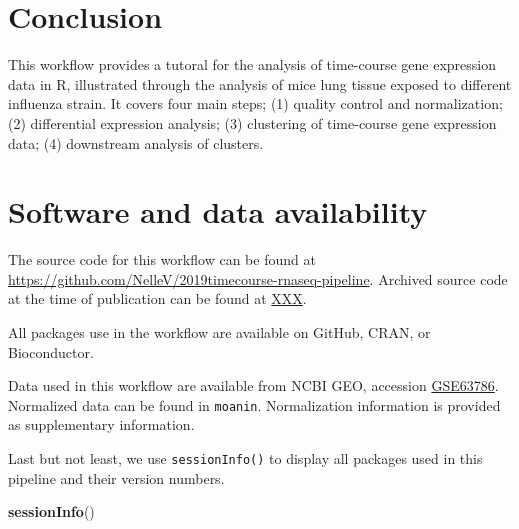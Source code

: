 \documentclass[9pt,a4paper,]{extarticle}
\newenvironment{Shaded}{\begin{snugshade}}{\end{snugshade}}
\newcommand{\KeywordTok}[1]{\textcolor[rgb]{0.13,0.29,0.53}{\textbf{#1}}}
\newcommand{\NormalTok}[1]{#1}
\begin{document}
\hypertarget{conclusion}{%
\section{Conclusion}\label{conclusion}}

This workflow provides a tutoral for the analysis of time-course gene
expression data in R, illustrated through the analysis of mice lung tissue
exposed to different influenza strain. It covers four main steps; (1) quality
control and normalization; (2) differential expression analysis; (3)
clustering of time-course gene expression data; (4) downstream analysis of
clusters.

\hypertarget{software-and-data-availability}{%
\section{Software and data availability}\label{software-and-data-availability}}

The source code for this workflow can be found at
\url{https://github.com/NelleV/2019timecourse-rnaseq-pipeline}.
Archived source code at the time of publication can be found at \url{XXX}.

All packages use in the workflow are available on GitHub, CRAN, or
Bioconductor.

Data used in this workflow are available from NCBI GEO, accession
\href{https://www.ncbi.nlm.nih.gov/geo/query/acc.cgi?acc=GSE63786}{GSE63786}.
Normalized data can be found in \texttt{moanin}. Normalization information is
provided as supplementary information.

Last but not least, we use \texttt{sessionInfo()} to display all packages used in
this pipeline and their version numbers.

\begin{Shaded}
\begin{Highlighting}[]
\KeywordTok{sessionInfo}\NormalTok{()}
\end{Highlighting}
\end{Shaded}
\end{document}
